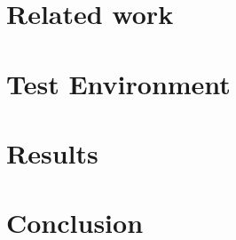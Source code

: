 \documentclass[sigplan,9pt]{acmart}
\begin{document}
\section{Related work}
\label{chap:existing_research}


\section{Test Environment}
\label{chap:test_env}


\section{Results}
\label{chap:results}


\section{Conclusion}
\label{chap:conclusion}




\end{document}
